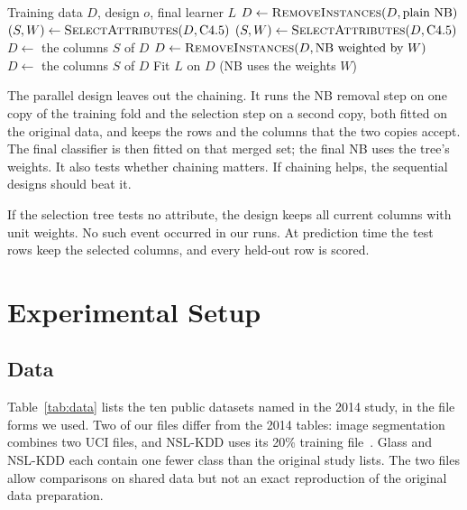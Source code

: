 \documentclass[conference]{IEEEtran}
\begin{document}
\begin{algorithm}[t]
\caption{The combined cleaning designs}
\label{alg:combined}
\begin{algorithmic}[1]
\Require Training data $D$, design $o$, final learner $L$
 \State $D\gets\Call{RemoveInstances}{D,\text{plain NB}}$
 \State $(S,W)\gets\Call{SelectAttributes}{D,\text{C4.5}}$
\Else
 \State $(S,W)\gets\Call{SelectAttributes}{D,\text{C4.5}}$
 \State $D\gets$ the columns $S$ of $D$
 \State $D\gets\Call{RemoveInstances}{D,\text{NB weighted by }W}$
\EndIf
{}
 \State $D\gets$ the columns $S$ of $D$
\EndIf
\State Fit $L$ on $D$ (NB uses the weights $W$)
\end{algorithmic}
\end{algorithm}

The parallel design leaves out the chaining. It runs the NB removal step on one
copy of the training fold and the selection step on a second copy, both fitted
on the original data, and keeps the rows and the columns that the two copies
accept. The final classifier is then fitted on that merged set; the final NB
uses the tree's weights. It also tests whether chaining matters. If chaining
helps, the sequential designs should beat it.

If the selection tree tests no attribute, the design keeps all current columns
with unit weights. No such event occurred in our runs. At prediction time the
test rows keep the selected columns, and every held-out row is scored.

\section{Experimental Setup}
\subsection{Data}
\label{sec:data}
Table~\ref{tab:data} lists the ten public datasets named in the 2014 study,
in the file forms we used. Two of our files differ from the 2014 tables: image
segmentation combines two UCI files, and NSL-KDD uses its 20\% training
file~\cite{tavallaee2009detailed}. Glass and NSL-KDD each contain one fewer
class than the original study lists. The two files allow comparisons on shared
data but not an exact reproduction of the original data preparation.
\end{document}
